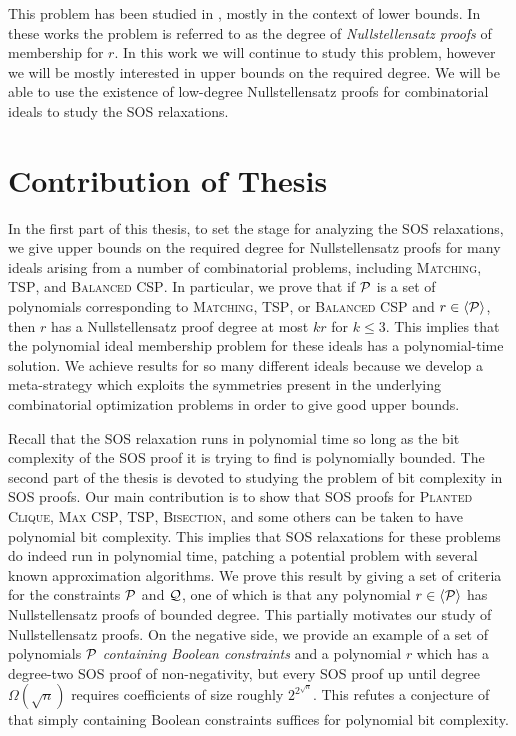 This problem has been studied in \cite{BIKPP94,BT98,Gri98,BGIP01}, mostly in the context of lower bounds. In these works the problem is referred to as the degree of \emph{Nullstellensatz proofs} of membership for $r$. In this work we will continue to study this problem, however we will be mostly interested in upper bounds on the required degree. We will be able to use the existence of low-degree Nullstellensatz proofs for combinatorial ideals to study the SOS relaxations. 



\section{Contribution of Thesis}\label{sec:intro_contrib}

In the first part of this thesis, to set the stage for analyzing the SOS relaxations, we give upper bounds on the required degree for Nullstellensatz proofs for many ideals arising from a number of combinatorial problems, including \textsc{Matching}, \textsc{TSP}, and \textsc{Balanced CSP}. In particular, we prove that if $\mathcal P$ is a set of polynomials corresponding to \textsc{Matching}, \textsc{TSP}, or \textsc{Balanced CSP} and $r \in \langle \mathcal P \rangle$, then $r$ has a Nullstellensatz proof degree at most $kr$ for $k\leq 3$. This implies that the polynomial ideal membership problem for these ideals has a polynomial-time solution. We achieve results for so many different ideals because we develop a meta-strategy which exploits the symmetries present in the underlying combinatorial optimization problems in order to give good upper bounds.

Recall that the SOS relaxation runs in polynomial time so long as the bit complexity of the SOS proof it is trying to find is polynomially bounded. 
The second part of the thesis is devoted to studying the problem of bit complexity in SOS proofs. 
Our main contribution is to show that SOS proofs for \textsc{Planted Clique}, \textsc{Max CSP}, \textsc{TSP}, \textsc{Bisection}, and some others can be taken to have polynomial bit complexity. This implies that SOS relaxations for these problems do indeed run in polynomial time, patching a potential problem with several known approximation algorithms. We prove this result by giving a set of criteria for the constraints $\mathcal P$ and $\mathcal Q$, one of which is that any polynomial $r \in \langle \mathcal P \rangle$ has Nullstellensatz proofs of bounded degree. This partially motivates our study of Nullstellensatz proofs. 
On the negative side, we provide an example of a set of polynomials $\mathcal P$ \emph{containing Boolean constraints} and a polynomial $r$ which has a degree-two SOS proof of non-negativity, but every SOS proof up until degree $\Omega(\sqrt{n})$ requires coefficients of size roughly $2^{2^{\sqrt{n}}}$. This refutes a conjecture of \cite{ODon16} that simply containing Boolean constraints suffices for polynomial bit complexity. 

